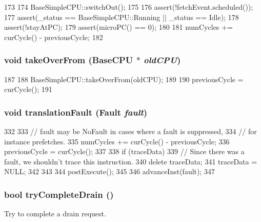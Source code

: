 \begin{DoxyCode}
173 {
174     BaseSimpleCPU::switchOut();
175 
176     assert(!fetchEvent.scheduled());
177     assert(_status == BaseSimpleCPU::Running || _status == Idle);
178     assert(!stayAtPC);
179     assert(microPC() == 0);
180 
181     numCycles += curCycle() - previousCycle;
182 }
\end{DoxyCode}
\hypertarget{classTimingSimpleCPU_ac82d2b8d331b2e8e6854a95d2917dfa2}{
\subsubsection[{takeOverFrom}]{\setlength{\rightskip}{0pt plus 5cm}void takeOverFrom ({\bf BaseCPU} $\ast$ {\em oldCPU})}}
\label{classTimingSimpleCPU_ac82d2b8d331b2e8e6854a95d2917dfa2}



\begin{DoxyCode}
187 {
188     BaseSimpleCPU::takeOverFrom(oldCPU);
189 
190     previousCycle = curCycle();
191 }
\end{DoxyCode}
\hypertarget{classTimingSimpleCPU_a5f6223adc354c36cc8773251dd7e0f4d}{
\subsubsection[{translationFault}]{\setlength{\rightskip}{0pt plus 5cm}void translationFault ({\bf Fault} {\em fault})}}
\label{classTimingSimpleCPU_a5f6223adc354c36cc8773251dd7e0f4d}



\begin{DoxyCode}
332 {
333     // fault may be NoFault in cases where a fault is suppressed,
334     // for instance prefetches.
335     numCycles += curCycle() - previousCycle;
336     previousCycle = curCycle();
337 
338     if (traceData) {
339         // Since there was a fault, we shouldn't trace this instruction.
340         delete traceData;
341         traceData = NULL;
342     }
343 
344     postExecute();
345 
346     advanceInst(fault);
347 }
\end{DoxyCode}
\hypertarget{classTimingSimpleCPU_abfea8f75a7a7480716801affeebbe87b}{
\subsubsection[{tryCompleteDrain}]{\setlength{\rightskip}{0pt plus 5cm}bool tryCompleteDrain ()}}
\label{classTimingSimpleCPU_abfea8f75a7a7480716801affeebbe87b}
Try to complete a drain request.

